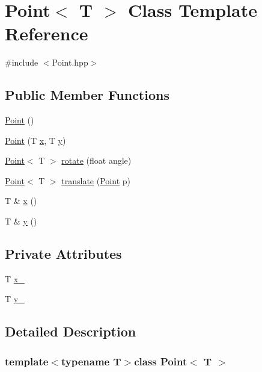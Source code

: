 \hypertarget{classPoint}{\section{Point$<$ T $>$ Class Template Reference}
\label{classPoint}
}


{\ttfamily \#include $<$Point.\-hpp$>$}

\subsection*{Public Member Functions}
\begin{DoxyCompactItemize}
\item 
\hyperlink{classPoint_aea76b1130f1a203722d8f2254ced8e66}{Point} ()
\item 
\hyperlink{classPoint_a4236452aa9c9f4cffc58b04180fea343}{Point} (T \hyperlink{classPoint_a97a274fff44375b5d60e209f26d7382f}{x}, T \hyperlink{classPoint_a71672fd35753d43129ff157127dba575}{y})
\item 
\hyperlink{classPoint}{Point}$<$ T $>$ \hyperlink{classPoint_a21b0a6ce6c6041b23604a27121786902}{rotate} (float angle)
\item 
\hyperlink{classPoint}{Point}$<$ T $>$ \hyperlink{classPoint_a5b03fdd5ae61621155265d59502a1beb}{translate} (\hyperlink{classPoint}{Point} p)
\item 
T \& \hyperlink{classPoint_a97a274fff44375b5d60e209f26d7382f}{x} ()
\item 
T \& \hyperlink{classPoint_a71672fd35753d43129ff157127dba575}{y} ()
\end{DoxyCompactItemize}
\subsection*{Private Attributes}
\begin{DoxyCompactItemize}
\item 
T \hyperlink{classPoint_a24a41ccfbe19d2318d94966128af271a}{x\-\_\-}
\item 
T \hyperlink{classPoint_a54b6f0a7faf44dd0263d57e332d266ad}{y\-\_\-}
\end{DoxyCompactItemize}


\subsection{Detailed Description}
\subsubsection*{template$<$typename T$>$class Point$<$ T $>$}



